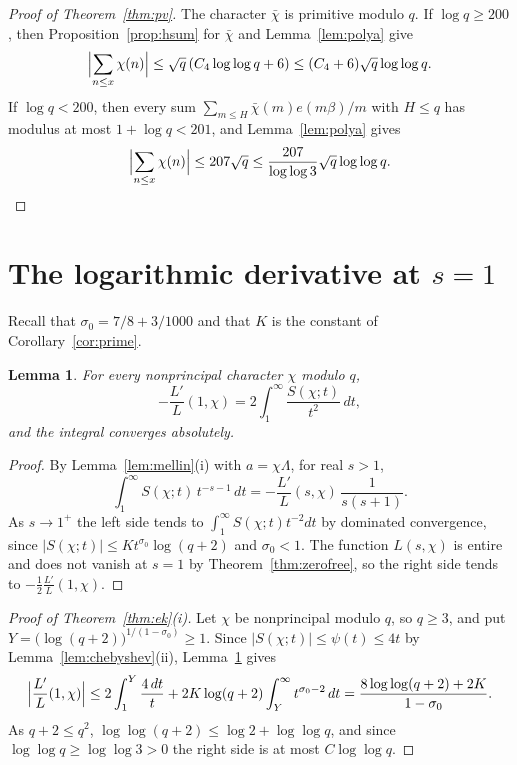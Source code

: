 \documentclass{aomart}
\numberwithin{equation}{section}
\newtheorem{lemma}[theorem]{Lemma}
\theoremstyle{definition}
\begin{document}
\begin{proof}[Proof of Theorem~\ref{thm:pv}]
The character $\bar\chi$ is primitive modulo $q$. If $\log q\ge200$, then
Proposition~\ref{prop:hsum} for $\bar\chi$ and Lemma~\ref{lem:polya} give
\[
  \Bigl|\sum_{n\le x}\chi(n)\Bigr|\le\sqrt q\,(C_4\log\log q+6)\le(C_4+6)\sqrt q\log\log q.
\]
If $\log q<200$, then every sum $\sum_{m\le H}\bar\chi(m)e(m\beta)/m$ with $H\le q$ has modulus at
most $1+\log q<201$, and Lemma~\ref{lem:polya} gives
\[
  \Bigl|\sum_{n\le x}\chi(n)\Bigr|\le207\sqrt q\le\frac{207}{\log\log3}\sqrt q\log\log q.\qedhere
\]
\end{proof}

\section{The logarithmic derivative at \texorpdfstring{$s=1$}{s=1}}\label{sec:ek}

Recall that $\sigma_0=7/8+3/1000$ and that $K$ is the constant of Corollary~\ref{cor:prime}.

\begin{lemma}\label{lem:atone}
For every nonprincipal character $\chi$ modulo $q$,
\[
  -\frac{L'}{L}(1,\chi)=2\int_1^\infty\frac{S(\chi;t)}{t^2}\,dt,
\]
and the integral converges absolutely.
\end{lemma}

\begin{proof}
By Lemma~\ref{lem:mellin}(i) with $a=\chi\Lambda$, for real $s>1$,
\[
  \int_1^\infty S(\chi;t)\,t^{-s-1}\,dt=-\frac{L'}{L}(s,\chi)\,\frac1{s(s+1)}.
\]
As $s\to1^+$ the left side tends to $\int_1^\infty S(\chi;t)t^{-2}dt$ by dominated convergence,
since $|S(\chi;t)|\le Kt^{\sigma_0}\log(q+2)$ and $\sigma_0<1$. The function $L(s,\chi)$ is
entire and does not vanish at $s=1$ by Theorem~\ref{thm:zerofree}, so the right side tends to
$-\frac12\frac{L'}{L}(1,\chi)$.
\end{proof}

\begin{proof}[Proof of Theorem~\ref{thm:ek}(i)]
Let $\chi$ be nonprincipal modulo $q$, so $q\ge3$, and put
$Y=\bigl(\log(q+2)\bigr)^{1/(1-\sigma_0)}\ge1$. Since $|S(\chi;t)|\le\psi(t)\le4t$ by
Lemma~\ref{lem:chebyshev}(ii), Lemma~\ref{lem:atone} gives
\[
  \Bigl|\frac{L'}{L}(1,\chi)\Bigr|\le2\int_1^Y\frac{4\,dt}t
  +2K\log(q+2)\int_Y^\infty t^{\sigma_0-2}\,dt
  =\frac{8\log\log(q+2)+2K}{1-\sigma_0}.
\]
As $q+2\le q^2$, $\log\log(q+2)\le\log2+\log\log q$, and since $\log\log q\ge\log\log3>0$ the
right side is at most $C\log\log q$.
\end{proof}
\end{document}

